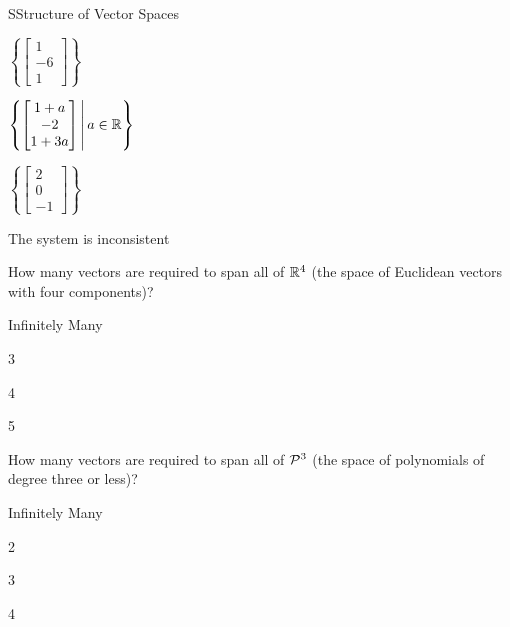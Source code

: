\documentclass{article}[12pt]
\begin{document}
\begin{module}{S}{Structure of Vector Spaces}
\begin{readinessAssuranceTest}
    \begin{multicols}{4}
    \begin{readinessAssuranceTestChoices}
    \item \(
  		  \left\{
  		  \begin{bmatrix}
              1 \\ -6 \\ 1
            \end{bmatrix}
  			\right\}
          \)
  		\item \(
  		 \setBuilder{
            \begin{bmatrix}
              1 +a\\ -2 \\ 1+3a
            \end{bmatrix}
  		  }{a \in \IR}
  		 \)
   	\item \(
  		  \left\{
            \begin{bmatrix}
              2 \\ 0 \\ -1
            \end{bmatrix}
  		  \right\}
          \) %


    \item The system is inconsistent
    \end{readinessAssuranceTestChoices}
    \end{multicols}




  \item How many vectors are required to span all of \(\IR^4\) (the space
    of Euclidean vectors with four components)?
    \begin{multicols}{4}
    \begin{readinessAssuranceTestChoices}
    \item Infinitely Many
    \item 3
    \item 4 %
    \item 5
    \end{readinessAssuranceTestChoices}
    \end{multicols}


  \item How many vectors are required to span all of \(\P^3\) (the space
    of polynomials of degree three or less)?
    \begin{multicols}{4}
    \begin{readinessAssuranceTestChoices}
    \item Infinitely Many
    \item 2
    \item 3
    \item 4 %
    \end{readinessAssuranceTestChoices}
    \end{multicols}




\end{readinessAssuranceTest}
\end{module}
\end{document}
